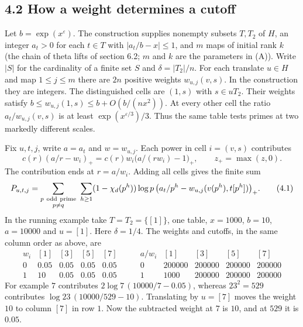 \documentclass[11pt,letterpaper]{article}
\begin{document}
{\newpage
\subsection*{4.2 How a weight determines a cutoff}

Let $b=\exp(x^\varepsilon)$. The construction supplies nonempty subsets $T,T_2$ of $H$, an integer $a_t>0$ for each $t\in T$ with $|a_t/b-x|\le1$, and $m$ maps of initial rank $k$ (the chain of theta lifts of section 6.2; $m$ and $k$ are the parameters in (A)). Write $|S|$ for the cardinality of a finite set $S$ and $\delta=|T_2|/n$. For each translate $u\in H$ and map $1\le j\le m$ there are $2n$ positive weights $w_{u,j}(v,s)$. In the construction they are integers. The distinguished cells are $(1,s)$ with $s\in uT_2$. Their weights satisfy $b\le w_{u,j}(1,s)\le b+O(b/(nx^2))$. At every other cell the ratio $a_t/w_{u,j}(v,s)$ is at least $\exp(x^{\varepsilon/3})/3$. Thus the same table tests primes at two markedly different scales.

Fix $u,t,j$, write $a=a_t$ and $w=w_{u,j}$. Each power in cell $i=(v,s)$ contributes
\begin{equation}\label{D:51}
 c(r)(a/r-w_i)_+
 =c(r)w_i\big(a/(rw_i)-1\big)_+,\qquad z_+=\max(z,0).
\end{equation}
The contribution ends at $r=a/w_i$. Adding all cells gives the finite sum
\begin{equation}\label{D:52}
 P_{u,t,j}=\sum_{\substack{p\ {\rm odd\ prime}\\p\ne q}}\ \sum_{h\ge1}
 (1-\chi_d(p^h))\log p\,
 \big(a_t/p^h-w_{u,j}(v(p^h),t[p^h])\big)_+ .                 \tag{4.1}
\end{equation}
In the running example take $T=T_2=\{[1]\}$, one table, $x=1000$, $b=10$, $a=10000$ and $u=[1]$. Here $\delta=1/4$. The weights and cutoffs, in the same column order as above, are
\begin{equation}\label{D:53}
 \begin{array}{c|rrrr}
 w_i &[1]&[3]&[5]&[7]\\ \hline
 0&0.05&0.05&0.05&0.05\\
 1&10&0.05&0.05&0.05
 \end{array}\qquad
 \begin{array}{c|rrrr}
 a/w_i &[1]&[3]&[5]&[7]\\ \hline
 0&200000&200000&200000&200000\\
 1&1000&200000&200000&200000
 \end{array}
\end{equation}
For example $7$ contributes $2\log 7\,(10000/7-0.05)$, whereas $23^2=529$ contributes $\log 23\,(10000/529-10)$. Translating by $u=[7]$ moves the weight $10$ to column $[7]$ in row $1$. Now the subtracted weight at $7$ is $10$, and at $529$ it is $0.05$.

}
\end{document}
